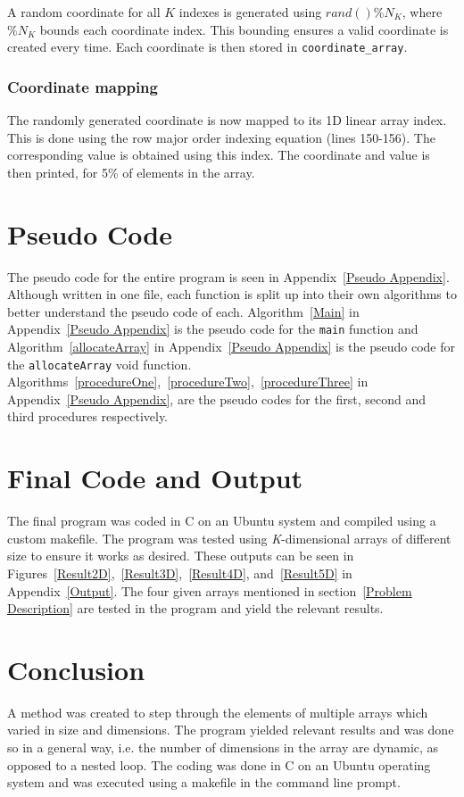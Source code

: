 \documentclass[10pt, conference]{IEEEtran}
\begin{document}
A random coordinate for all $K$ indexes is generated using \texttt{$rand()\%N_K$}, where \texttt{$\%N_K$} bounds each coordinate index. This bounding ensures a valid coordinate is created every time. Each coordinate is then stored in  \texttt{coordinate\_array}.
\subsubsection{Coordinate mapping}
The randomly generated coordinate is now mapped to its 1D linear array index. This is done using the row major order indexing equation (lines 150-156). The corresponding value is obtained using this index. The coordinate and value is then printed, for 5\% of elements in the array.

\section{Pseudo Code}
\label{Pseudo Code}
The pseudo code for the entire program is seen in Appendix~\ref{Pseudo Appendix}. Although written in one file, each function is split up into their own algorithms to better understand the pseudo code of each. Algorithm~\ref{Main} in Appendix~\ref{Pseudo Appendix} is the pseudo code for the \texttt{main} function and Algorithm~\ref{allocateArray} in Appendix~\ref{Pseudo Appendix} is the pseudo code for the \texttt{allocateArray} void function. Algorithms~\ref{procedureOne},~\ref{procedureTwo},~\ref{procedureThree} in Appendix~\ref{Pseudo Appendix}, are the pseudo codes for the first, second and third procedures respectively.

\section{Final Code and Output}
\label{Final Code and Output}
The final program was coded in C on an Ubuntu system and compiled using a custom makefile. The program was tested using \emph{K}-dimensional arrays of different size to ensure it works as desired. These outputs can be seen in Figures~\ref{Result2D},~\ref{Result3D},~\ref{Result4D}, and~\ref{Result5D} in Appendix~\ref{Output}. The four given arrays mentioned in section~\ref{Problem Description} are tested in the program and yield the relevant results.


\section{Conclusion}
\label{Conclusion}
A method was created to step through the elements of multiple arrays which varied in size and dimensions. The program yielded relevant results and was done so in a general way, i.e. the number of dimensions in the array are dynamic, as opposed to a nested loop. The coding was done in C on an Ubuntu operating system and was executed using a makefile in the command line prompt.
\end{document}
